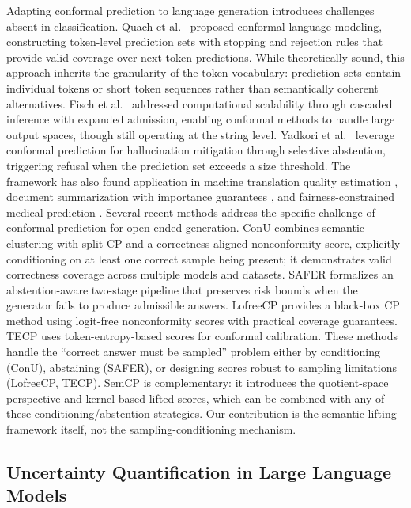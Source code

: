 \documentclass{article}
\begin{document}
Adapting conformal prediction to language generation introduces challenges absent in classification. Quach et al.\ \cite{quach2023conformal} proposed conformal language modeling, constructing token-level prediction sets with stopping and rejection rules that provide valid coverage over next-token predictions. While theoretically sound, this approach inherits the granularity of the token vocabulary: prediction sets contain individual tokens or short token sequences rather than semantically coherent alternatives. Fisch et al.\ \cite{fisch2020efficient} addressed computational scalability through cascaded inference with expanded admission, enabling conformal methods to handle large output spaces, though still operating at the string level. Yadkori et al.\ \cite{yadkori2024mitigating} leverage conformal prediction for hallucination mitigation through selective abstention, triggering refusal when the prediction set exceeds a size threshold. The framework has also found application in machine translation quality estimation \cite{giovannotti2023evaluating}, document summarization with importance guarantees \cite{kuwahara2025document}, and fairness-constrained medical prediction \cite{lu2022fair}. Several recent methods address the specific challenge of conformal prediction for open-ended generation. ConU \cite{wang2024conu} combines semantic clustering with split CP and a correctness-aligned nonconformity score, explicitly conditioning on at least one correct sample being present; it demonstrates valid correctness coverage across multiple models and datasets. SAFER \cite{kumar2025safer} formalizes an abstention-aware two-stage pipeline that preserves risk bounds when the generator fails to produce admissible answers. LofreeCP \cite{su2024lofreecp} provides a black-box CP method using logit-free nonconformity scores with practical coverage guarantees. TECP \cite{huang2025tecp} uses token-entropy-based scores for conformal calibration. These methods handle the ``correct answer must be sampled'' problem either by conditioning (ConU), abstaining (SAFER), or designing scores robust to sampling limitations (LofreeCP, TECP). SemCP is complementary: it introduces the quotient-space perspective and kernel-based lifted scores, which can be combined with any of these conditioning/abstention strategies. Our contribution is the semantic lifting framework itself, not the sampling-conditioning mechanism.

\subsection{Uncertainty Quantification in Large Language Models}
\end{document}
